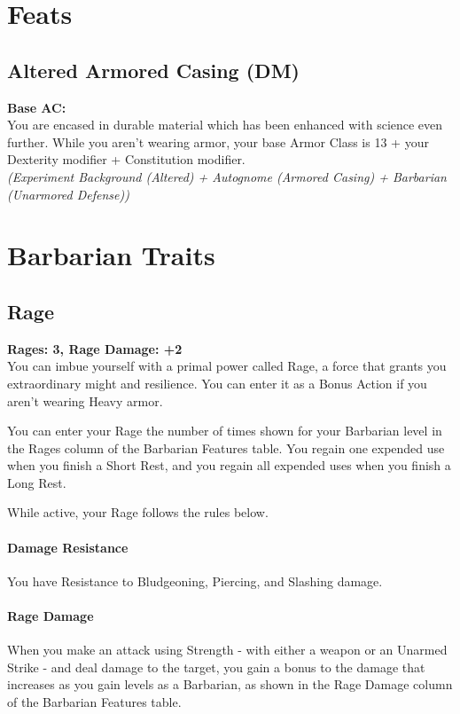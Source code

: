 \documentclass[letterpaper,openany,oneside,twocolumn]{book}
\begin{document}
\section*{Feats}
\subsection*{Altered Armored Casing (DM)}
\textbf{Base AC: }\\
You are encased in  durable material which has been enhanced with science even further. While you aren't wearing armor, your base Armor Class is 13 + your Dexterity modifier + Constitution modifier.\\
\textit{(Experiment Background (Altered) + Autognome (Armored Casing) + Barbarian (Unarmored Defense))}

\section*{Barbarian Traits}
\subsection*{Rage}
\textbf{Rages: 3, Rage Damage: +2}\\
You can imbue yourself with a primal power called Rage, a force that grants you extraordinary might and resilience. You can enter it as a Bonus Action if you aren't wearing Heavy armor.

You can enter your Rage the number of times shown for your Barbarian level in the Rages column of the Barbarian Features table. You regain one expended use when you finish a Short Rest, and you regain all expended uses when you finish a Long Rest.

While active, your Rage follows the rules below.

\paragraph*{Damage Resistance} You have Resistance to Bludgeoning, Piercing, and Slashing damage.

\paragraph*{Rage Damage} When you make an attack using Strength - with either a weapon or an Unarmed Strike - and deal damage to the target, you gain a bonus to the damage that increases as you gain levels as a Barbarian, as shown in the Rage Damage column of the Barbarian Features table.
\end{document}
